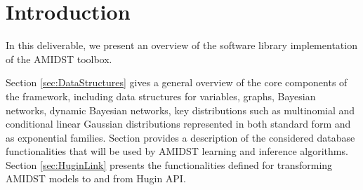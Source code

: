 \section{Introduction}

In this deliverable, we present an overview of the software library implementation of the AMIDST toolbox.  

Section \ref{sec:DataStructures} gives a general overview of the core components of the framework, including data structures for variables, graphs, Bayesian networks, dynamic Bayesian networks, key distributions such as multinomial and conditional linear Gaussian distributions represented in both standard form and as exponential families. Section \label{sec:DataBases} provides a description of the considered database functionalities that will be used by AMIDST learning and inference algorithms. Section \ref{sec:HuginLink} presents the functionalities defined for transforming AMIDST models to and from Hugin API.